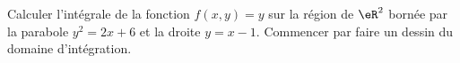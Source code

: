 \begin{exercice}\label{exoGeomAnal-0023}

Calculer l'intégrale de la fonction $f(x,y)=y$ sur la région de $\eR^2$ bornée par la parabole $y^2=2x+6$ et la droite $y=x-1$. Commencer par faire un dessin du domaine d'intégration. 


\end{exercice}
